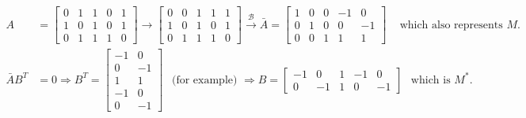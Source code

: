 \begin{equation*}
    \begin{split}
        A & = \left[
            \begin{array}{ccccc}
                0 & 1 & 1 & 0 & 1 \\
                1 & 0 & 1 & 0 & 1 \\
                0 & 1 & 1 & 1 & 0
            \end{array}
        \right]
        \longrightarrow
        \left[
            \begin{array}{ccccc}
                0 & 0 & 1 & 1 & 1 \\
                1 & 0 & 1 & 0 & 1 \\
                0 & 1 & 1 & 1 & 0
            \end{array}
        \right]
        \overset{\mathcal{B}}{\longrightarrow}
        \bar{A} = \left[
            \begin{array}{ccccc}
                1 & 0 & 0 & -1 & 0 \\
                0 & 1 & 0 & 0 & -1 \\
                0 & 0 & 1 & 1 & 1
            \end{array}
        \right]
        \hspace{10pt} \text{ which also represents $M$.} \\[10pt]
        \bar{A}B^T & = 0 \Longrightarrow 
        B^T = \left[
            \begin{array}{cc}
                -1 & 0  \\
                0  & -1 \\
                1  & 1 \\
                -1 & 0 \\
                0 & -1
            \end{array}
        \right] \hspace{5pt} \text{ (for example) } \Longrightarrow
        B = \left[
            \begin{array}{ccccc}
                -1 & 0 & 1 & -1 & 0 \\
                0 & -1 & 1 & 0 & -1
            \end{array} 
        \right] \hspace{5pt} \text{ which is $M^*$.}
    \end{split}
\end{equation*}

